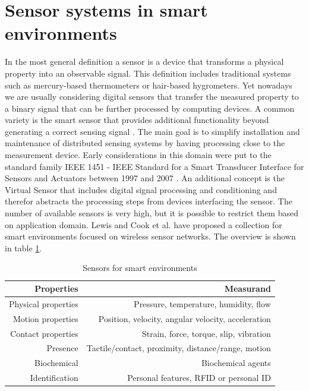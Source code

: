 \section{Sensor systems in smart environments}
\label{ch:rel_sensor_tech}
In the most general definition a sensor is a device that transforms a physical property into an observable signal. This definition includes traditional systems such as mercury-based thermometers or hair-based hygrometers. Yet nowadays we are usually considering digital sensors that transfer the measured property to a binary signal that can be further processed by computing devices. 
A common variety is the smart sensor that provides additional functionality beyond generating a correct sensing signal \cite{frank2013understanding}. The main goal is to simplify installation and maintenance of distributed sensing systems by having processing close to the measurement device. Early considerations in this domain were put to the standard family IEEE 1451 - IEEE Standard for a Smart Transducer Interface for Sensors and Actuators between 1997 and 2007 \cite{ieee1451}. An additional concept is the Virtual Sensor that includes digital signal processing and conditioning and therefor abstracts the processing steps from devices interfacing the sensor. 
The number of available sensors is very high, but it is possible to restrict them based on application domain. Lewis and Cook et al. \cite{lewis2004wireless,cook2007smart} have proposed a collection for smart environments focused on wireless sensor networks. The overview is shown in table \ref{tab:sen_smart_env}.
\begin{table}[htbp]
  \centering
  \caption{Sensors for smart environments \cite{cook2007smart}}
    \begin{tabular}{rr}
    \toprule
    \textbf{Properties } & \textbf{Measurand} \\
    \midrule
    Physical properties  & Pressure, temperature, humidity, flow \\ \addlinespace
    Motion properties  & Position, velocity, angular velocity, acceleration \\ \addlinespace
    Contact properties  & Strain, force, torque, slip, vibration \\ \addlinespace
    Presence  & Tactile/contact, proximity, distance/range, motion \\ \addlinespace
    Biochemical  & Biochemical agents \\ \addlinespace
    Identification  & Personal features, RFID or personal ID \\
    \bottomrule
    \end{tabular}%

  \label{tab:sen_smart_env}%
\end{table}%
